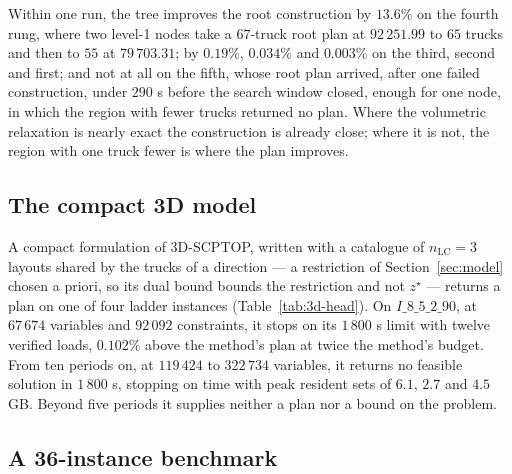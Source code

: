 Within one run, the tree improves the root construction by $13.6\%$ on
the fourth rung, where two level-1 nodes take a $67$-truck root plan at
$92\,251.99$ to $65$ trucks and then to $55$ at $79\,703.31$; by
$0.19\%$, $0.034\%$ and $0.003\%$ on the third, second and first; and
not at all on the fifth, whose root plan arrived, after one failed
construction, under $290$ s before the search window closed, enough for
one node, in which the region with fewer trucks returned no plan. Where
the volumetric relaxation is nearly exact the construction is already
close; where it is not, the region with one truck fewer is where the
plan improves.

\subsection{The compact 3D model}
\label{sec:res-compact}



A compact formulation of 3D-SCPTOP, written with a catalogue of
$n_{\mathrm{LC}}=3$ layouts shared by the trucks of a direction --- a
restriction of Section~\ref{sec:model} chosen a priori, so its dual
bound bounds the restriction and not $z^{\star}$ --- returns a plan on
one of four ladder instances (Table~\ref{tab:3d-head}). On
$I\_8\_5\_2\_90$, at $67\,674$ variables and $92\,092$ constraints, it
stops on its $1\,800$ s limit with twelve verified loads, $0.102\%$
above the method's plan at twice the method's budget. From ten periods
on, at $119\,424$ to $322\,734$ variables, it returns no feasible
solution in $1\,800$ s, stopping on time with peak resident sets of
$6.1$, $2.7$ and $4.5$ GB. Beyond five periods it supplies neither a
plan nor a bound on the problem.

\subsection{A 36-instance benchmark}
\label{sec:res-bench}

